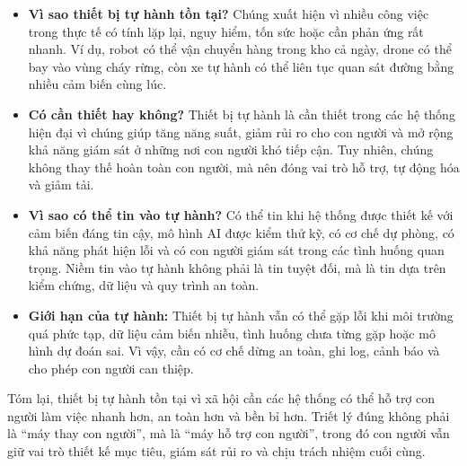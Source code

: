 \begin{itemize}
    \item \textbf{Vì sao thiết bị tự hành tồn tại?} Chúng xuất hiện vì nhiều công việc trong thực tế có tính lặp lại, nguy hiểm, tốn sức hoặc cần phản ứng rất nhanh. Ví dụ, robot có thể vận chuyển hàng trong kho cả ngày, drone có thể bay vào vùng cháy rừng, còn xe tự hành có thể liên tục quan sát đường bằng nhiều cảm biến cùng lúc.

    \item \textbf{Có cần thiết hay không?} Thiết bị tự hành là cần thiết trong các hệ thống hiện đại vì chúng giúp tăng năng suất, giảm rủi ro cho con người và mở rộng khả năng giám sát ở những nơi con người khó tiếp cận. Tuy nhiên, chúng không thay thế hoàn toàn con người, mà nên đóng vai trò hỗ trợ, tự động hóa và giảm tải.

    \item \textbf{Vì sao có thể tin vào tự hành?} Có thể tin khi hệ thống được thiết kế với cảm biến đáng tin cậy, mô hình AI được kiểm thử kỹ, có cơ chế dự phòng, có khả năng phát hiện lỗi và có con người giám sát trong các tình huống quan trọng. Niềm tin vào tự hành không phải là tin tuyệt đối, mà là tin dựa trên kiểm chứng, dữ liệu và quy trình an toàn.

    \item \textbf{Giới hạn của tự hành:} Thiết bị tự hành vẫn có thể gặp lỗi khi môi trường quá phức tạp, dữ liệu cảm biến nhiễu, tình huống chưa từng gặp hoặc mô hình dự đoán sai. Vì vậy, cần có cơ chế dừng an toàn, ghi log, cảnh báo và cho phép con người can thiệp.
\end{itemize}

Tóm lại, thiết bị tự hành tồn tại vì xã hội cần các hệ thống có thể hỗ trợ con người làm việc nhanh hơn, an toàn hơn và bền bỉ hơn. Triết lý đúng không phải là ``máy thay con người'', mà là ``máy hỗ trợ con người'', trong đó con người vẫn giữ vai trò thiết kế mục tiêu, giám sát rủi ro và chịu trách nhiệm cuối cùng.